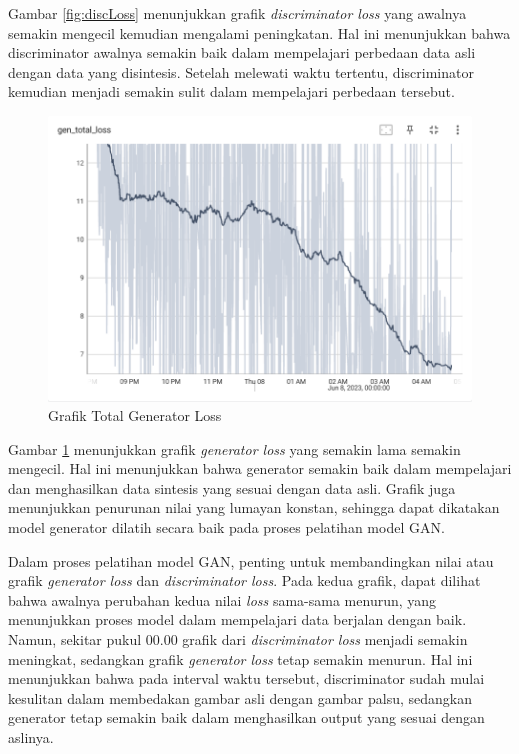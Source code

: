 Gambar \ref{fig:discLoss} menunjukkan grafik \emph{discriminator loss} yang awalnya semakin mengecil kemudian mengalami peningkatan. 
Hal ini menunjukkan bahwa discriminator awalnya semakin baik dalam mempelajari perbedaan data asli dengan data yang disintesis. 
Setelah melewati waktu tertentu, discriminator kemudian menjadi semakin sulit dalam mempelajari perbedaan tersebut. 

\begin{figure}[ht]
  \centering
  \includegraphics[scale=0.6]{gambar/Gen_total_loss.png}
  \caption{Grafik Total Generator Loss}
  \label{fig:genLoss}
\end{figure}

Gambar \ref{fig:genLoss} menunjukkan grafik \emph{generator loss} yang semakin lama semakin mengecil. 
Hal ini menunjukkan bahwa generator semakin baik dalam mempelajari dan menghasilkan data sintesis yang sesuai dengan data asli. 
Grafik juga menunjukkan penurunan nilai yang lumayan konstan, sehingga dapat dikatakan model generator dilatih secara baik pada proses pelatihan model GAN.

Dalam proses pelatihan model GAN, penting untuk membandingkan nilai atau grafik \emph{generator loss} dan \emph{discriminator loss}. 
Pada kedua grafik, dapat dilihat bahwa awalnya perubahan kedua nilai \emph{loss} sama-sama menurun, yang menunjukkan proses model dalam mempelajari data berjalan dengan baik. 
Namun, sekitar pukul 00.00 grafik dari \emph{discriminator loss} menjadi semakin meningkat, sedangkan grafik \emph{generator loss} tetap semakin menurun. 
Hal ini menunjukkan bahwa pada interval waktu tersebut, discriminator sudah mulai kesulitan dalam membedakan gambar asli dengan gambar palsu, sedangkan generator tetap semakin baik dalam menghasilkan output yang sesuai dengan aslinya.


